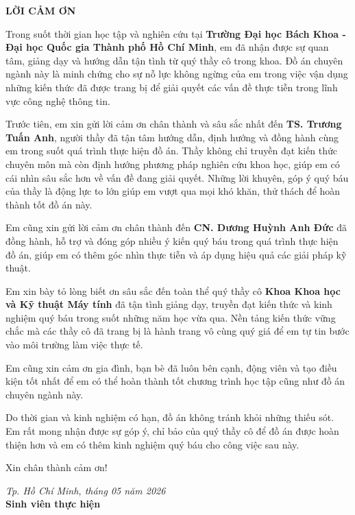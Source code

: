 \thispagestyle{empty} %

\noindent
\vspace{0.2cm}
\begin{center}
    \textbf{\LARGE LỜI CẢM ƠN}
\end{center}
\vspace{1cm} %


Trong suốt thời gian học tập và nghiên cứu tại \textbf{Trường Đại học Bách Khoa - Đại học Quốc gia Thành phố Hồ Chí Minh}, em đã nhận được sự quan tâm, giảng dạy và hướng dẫn tận tình từ quý thầy cô trong khoa. Đồ án chuyên ngành này là minh chứng cho sự nỗ lực không ngừng của em trong việc vận dụng những kiến thức đã được trang bị để giải quyết các vấn đề thực tiễn trong lĩnh vực công nghệ thông tin.

Trước tiên, em xin gửi lời cảm ơn chân thành và sâu sắc nhất đến \textbf{TS. Trương Tuấn Anh}, người thầy đã tận tâm hướng dẫn, định hướng và đồng hành cùng em trong suốt quá trình thực hiện đồ án. Thầy không chỉ truyền đạt kiến thức chuyên môn mà còn định hướng phương pháp nghiên cứu khoa học, giúp em có cái nhìn sâu sắc hơn về vấn đề đang giải quyết. Những lời khuyên, góp ý quý báu của thầy là động lực to lớn giúp em vượt qua mọi khó khăn, thử thách để hoàn thành tốt đồ án này.

Em cũng xin gửi lời cảm ơn chân thành đến \textbf{CN. Dương Huỳnh Anh Đức} đã đồng hành, hỗ trợ và đóng góp nhiều ý kiến quý báu trong quá trình thực hiện đồ án, giúp em có thêm góc nhìn thực tiễn và áp dụng hiệu quả các giải pháp kỹ thuật.

Em xin bày tỏ lòng biết ơn sâu sắc đến toàn thể quý thầy cô \textbf{Khoa Khoa học và Kỹ thuật Máy tính} đã tận tình giảng dạy, truyền đạt kiến thức và kinh nghiệm quý báu trong suốt những năm học vừa qua. Nền tảng kiến thức vững chắc mà các thầy cô đã trang bị là hành trang vô cùng quý giá để em tự tin bước vào môi trường làm việc thực tế.

Em cũng xin cảm ơn gia đình, bạn bè đã luôn bên cạnh, động viên và tạo điều kiện tốt nhất để em có thể hoàn thành tốt chương trình học tập cũng như đồ án chuyên ngành này.

Do thời gian và kinh nghiệm có hạn, đồ án không tránh khỏi những thiếu sót. Em rất mong nhận được sự góp ý, chỉ bảo của quý thầy cô để đồ án được hoàn thiện hơn và em có thêm kinh nghiệm quý báu cho công việc sau này.

Xin chân thành cảm ơn!

\vspace{1.5cm}
\begin{flushright}
    \textit{Tp. Hồ Chí Minh, tháng 05 năm 2026} \\
    \vspace{0.2cm}
    \textbf{Sinh viên thực hiện}
\end{flushright}
